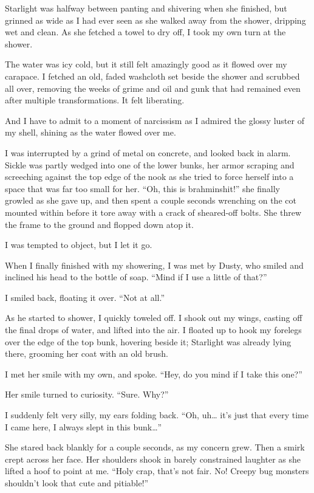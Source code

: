 Starlight was halfway between panting and shivering when she finished, but grinned as wide as I had ever seen as she walked away from the shower, dripping wet and clean. As she fetched a towel to dry off, I took my own turn at the shower.

The water was icy cold, but it still felt amazingly good as it flowed over my carapace. I fetched an old, faded washcloth set beside the shower and scrubbed all over, removing the weeks of grime and oil and gunk that had remained even after multiple transformations. It felt liberating.

And I have to admit to a moment of narcissism as I admired the glossy luster of my shell, shining as the water flowed over me.

I was interrupted by a grind of metal on concrete, and looked back in alarm. Sickle was partly wedged into one of the lower bunks, her armor scraping and screeching against the top edge of the nook as she tried to force herself into a space that was far too small for her. “Oh, this is brahminshit!” she finally growled as she gave up, and then spent a couple seconds wrenching on the cot mounted within before it tore away with a crack of sheared-off bolts. She threw the frame to the ground and flopped down atop it.

I was tempted to object, but I let it go.

When I finally finished with my showering, I was met by Dusty, who smiled and inclined his head to the bottle of soap. “Mind if I use a little of that?”

I smiled back, floating it over. “Not at all.”

As he started to shower, I quickly toweled off. I shook out my wings, casting off the final drops of water, and lifted into the air. I floated up to hook my forelegs over the edge of the top bunk, hovering beside it; Starlight was already lying there, grooming her coat with an old brush.

I met her smile with my own, and spoke. “Hey, do you mind if I take this one?”

Her smile turned to curiosity. “Sure. Why?”

I suddenly felt very silly, my ears folding back. “Oh, uh… it’s just that every time I came here, I always slept in this bunk…”

She stared back blankly for a couple seconds, as my concern grew. Then a smirk crept across her face. Her shoulders shook in barely constrained laughter as she lifted a hoof to point at me. “Holy crap, that’s not fair. No! Creepy bug monsters shouldn’t look that cute and pitiable!”

